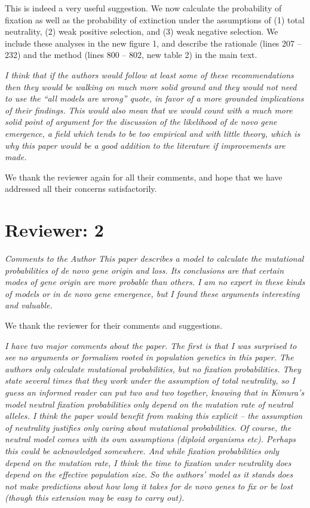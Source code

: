 \documentclass[12pt,a4paper]{article}
\begin{document}
This is indeed a very useful suggestion. We now calculate the probability of fixation as well as the probability of extinction under the assumptions of (1) total neutrality, (2) weak positive selection, and (3) weak negative selection. We include these analyses in the new figure 1, and describe the rationale (lines 207 -- 232) and the method (lines 800 -- 802, new table 2) in the main text.

{\itshape I think that if the authors would follow at least some of these recommendations then they would be walking on much more solid ground and they would not need to use the ``all models are wrong'' quote, in favor of a more grounded implications of their findings. This would also mean that we would count with a much more solid point of argument for the discussion of the likelihood of de novo gene emergence, a field which tends to be too empirical and with little theory, which is why this paper would be a good addition to the literature if improvements are made.}

We thank the reviewer again for all their comments, and hope that we have addressed all their concerns satisfactorily.

\section*{Reviewer: 2}

{\itshape Comments to the Author
This paper describes a model to calculate the mutational probabilities of de novo gene origin and loss. Its conclusions are that certain modes of gene origin are more probable than others. I am no expert in these kinds of models or in de novo gene emergence, but I found these arguments interesting and valuable.}

We thank the reviewer for their comments and suggestions.

{\itshape I have two major comments about the paper. The first is that I was surprised to see no arguments or formalism rooted in population genetics in this paper. The authors only calculate mutational probabilities, but no fixation probabilities. They state several times that they work under the assumption of total neutrality, so I guess an informed reader can put two and two together, knowing that in Kimura's model neutral fixation probabilities only depend on the mutation rate of neutral alleles. I think the paper would benefit from making this explicit -- the assumption of neutrality justifies only caring about mutational probabilities. Of course, the neutral model comes with its own assumptions (diploid organisms  etc). Perhaps this could be acknowledged somewhere. And while fixation probabilities only depend on the mutation rate, I think the time to fixation under neutrality does depend on the effective population size. So the authors' model as it stands does not make predictions about how long it takes for de novo genes to fix or be lost (though this extension may be easy to carry out).}
\end{document}
